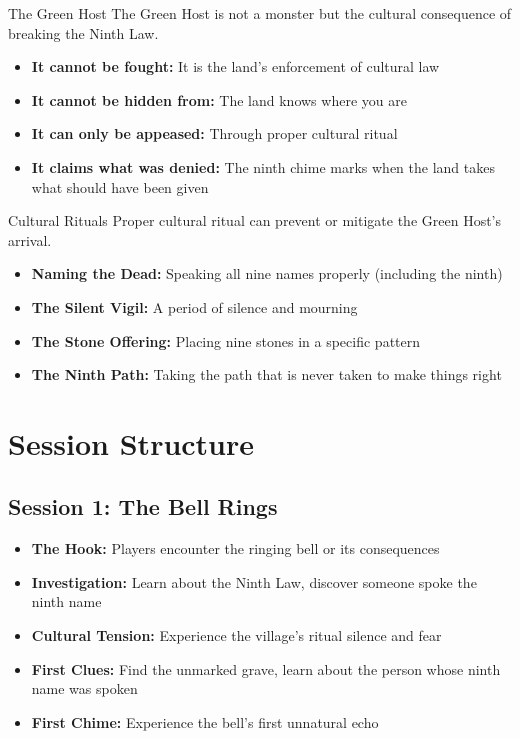\documentclass[11pt]{article}
\begin{document}
\begin{mechanicsbox}{The Green Host}
The Green Host is not a monster but the cultural consequence of breaking the Ninth Law.
\begin{itemize}
    \item \textbf{It cannot be fought:} It is the land's enforcement of cultural law
    \item \textbf{It cannot be hidden from:} The land knows where you are
    \item \textbf{It can only be appeased:} Through proper cultural ritual
    \item \textbf{It claims what was denied:} The ninth chime marks when the land takes what should have been given
\end{itemize}
\end{mechanicsbox}

\begin{mechanicsbox}{Cultural Rituals}
Proper cultural ritual can prevent or mitigate the Green Host's arrival.
\begin{itemize}
    \item \textbf{Naming the Dead:} Speaking all nine names properly (including the ninth)
    \item \textbf{The Silent Vigil:} A period of silence and mourning
    \item \textbf{The Stone Offering:} Placing nine stones in a specific pattern
    \item \textbf{The Ninth Path:} Taking the path that is never taken to make things right
\end{itemize}
\end{mechanicsbox}

\section*{Session Structure}

\subsection*{Session 1: The Bell Rings}
\begin{itemize}
    \item \textbf{The Hook:} Players encounter the ringing bell or its consequences
    \item \textbf{Investigation:} Learn about the Ninth Law, discover someone spoke the ninth name
    \item \textbf{Cultural Tension:} Experience the village's ritual silence and fear
    \item \textbf{First Clues:} Find the unmarked grave, learn about the person whose ninth name was spoken
    \item \textbf{First Chime:} Experience the bell's first unnatural echo
\end{itemize}
\end{document}
